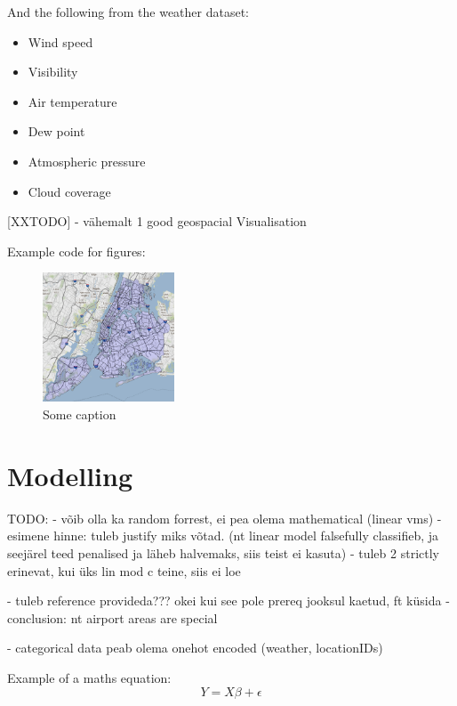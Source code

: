 \documentclass[11pt]{article}
\begin{document}
And the following from the weather dataset:
\begin{itemize}
    \item Wind speed
    \item Visibility
    \item Air temperature
    \item Dew point
    \item Atmospheric pressure
    \item Cloud coverage
\end{itemize}

[XXTODO] - vähemalt 1 good geospacial Visualisation

Example code for figures:
\begin{figure}[h]
    \includegraphics[width=0.35\textwidth]{nyc_map.PNG}
    \centering
    \caption{Some caption} %
\end{figure}

\section{Modelling}
TODO:
    - võib olla ka random forrest, ei pea olema mathematical (linear vms)
    - esimene hinne: tuleb justify miks võtad. (nt linear model falsefully classifieb, ja seejärel teed penalised ja läheb halvemaks, siis teist ei kasuta)
        - tuleb 2 strictly erinevat, kui üks lin mod c teine, siis ei loe

    - tuleb reference provideda??? okei kui see pole prereq jooksul kaetud, ft küsida
    - conclusion: nt airport areas are special

- categorical data peab olema onehot encoded (weather, locationIDs)

Example of a maths equation:
\begin{equation}
    Y = X\beta + \epsilon
\end{equation}
\end{document}
